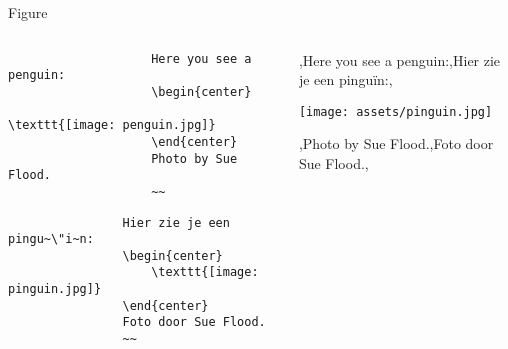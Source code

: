 \begin{frame}[fragile]{Figure}
    \begin{columns}
        \begin{column}{0.68\textwidth}
            \ifenglish
            \begin{codebox}%
                \begin{verbatim}
                    Here you see a penguin:
                    \begin{center}
                        \texttt{[image: penguin.jpg]}
                    \end{center}
                    Photo by Sue Flood.
                    ~~
                \end{verbatim}
            \end{codebox}
            \else
            \begin{codebox}%
            \begin{verbatim}
                Hier zie je een pingu~\"i~n:
                \begin{center}
                    \texttt{[image: pinguin.jpg]}
                \end{center}
                Foto door Sue Flood.
                ~~
            \end{verbatim}
            \end{codebox}
            \fi
        \end{column}
        \begin{column}{0.32\textwidth}
            \lang,Here you see a penguin:,Hier zie je een pinguïn:,
            \begin{center}
                \texttt{[image: assets/pinguin.jpg]}
            \end{center}
            \lang,Photo by Sue Flood.,Foto door Sue Flood.,
        \end{column}
    \end{columns}


    
\end{frame}

